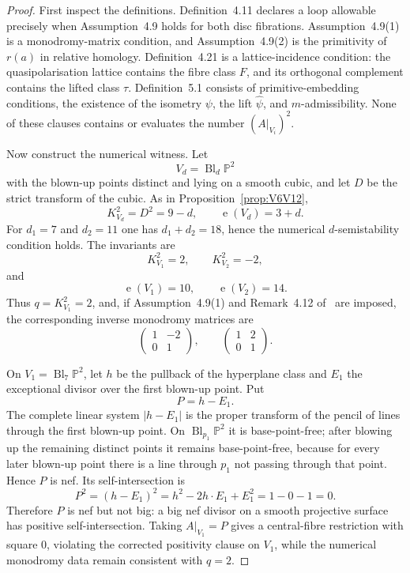\documentclass[12pt]{article}
\theoremstyle{plain}
\theoremstyle{definition}
\DeclareMathOperator{\Bl}{Bl}
\DeclareMathOperator{\eul}{e}
\newcommand{\bP}{\mathbb{P}}
\begin{document}
\begin{proof}
First inspect the definitions.  Definition~4.11 declares a loop allowable precisely when Assumption~4.9 holds for both disc fibrations.  Assumption~4.9(1) is a monodromy-matrix condition, and Assumption~4.9(2) is the primitivity of $r(a)$ in relative homology.  Definition~4.21 is a lattice-incidence condition: the quasipolarisation lattice contains the fibre class $F$, and its orthogonal complement contains the lifted class $\tau$.  Definition~5.1 consists of primitive-embedding conditions, the existence of the isometry $\psi$, the lift $\widehat\psi$, and $m$-admissibility.  None of these clauses contains or evaluates the number $(A|_{V_i})^2$.

Now construct the numerical witness.  Let
\[
V_d=\Bl_d\bP^2
\]
with the blown-up points distinct and lying on a smooth cubic, and let $D$ be the strict transform of the cubic.  As in Proposition~\ref{prop:V6V12},
\[
K_{V_d}^2=D^2=9-d,
\qquad
\eul(V_d)=3+d.
\]
For $d_1=7$ and $d_2=11$ one has $d_1+d_2=18$, hence the numerical $d$-semistability condition holds.  The invariants are
\[
K_{V_1}^2=2,\qquad K_{V_2}^2=-2,
\]
and
\[
\eul(V_1)=10,\qquad \eul(V_2)=14.
\]
Thus $q=K_{V_1}^2=2$, and, if Assumption~4.9(1) and Remark~4.12 of~\cite{GT24} are imposed, the corresponding inverse monodromy matrices are
\[
\begin{pmatrix}
1 & -2\\
0 & 1
\end{pmatrix},
\qquad
\begin{pmatrix}
1 & 2\\
0 & 1
\end{pmatrix}.
\]

On $V_1=\Bl_7\bP^2$, let $h$ be the pullback of the hyperplane class and $E_1$ the exceptional divisor over the first blown-up point.  Put
\[
P = h-E_1.
\]
The complete linear system $|h-E_1|$ is the proper transform of the pencil of lines through the first blown-up point.  On $\Bl_{p_1}\bP^2$ it is base-point-free; after blowing up the remaining distinct points it remains base-point-free, because for every later blown-up point there is a line through $p_1$ not passing through that point.  Hence $P$ is nef.  Its self-intersection is
\[
P^2 = (h-E_1)^2 = h^2 - 2h\cdot E_1 + E_1^2 = 1 - 0 - 1 = 0.
\]
Therefore $P$ is nef but not big: a big nef divisor on a smooth projective surface has positive self-intersection.  Taking $A|_{V_1}=P$ gives a central-fibre restriction with square $0$, violating the corrected positivity clause on $V_1$, while the numerical monodromy data remain consistent with $q=2$.


\end{proof}
\end{document}
